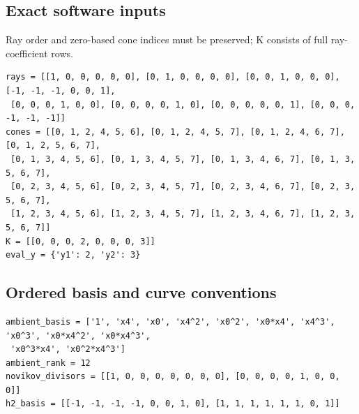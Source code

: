 \documentclass[10pt,a4paper]{article}
\begin{document}
\subsection*{Exact software inputs}
Ray order and zero-based cone indices must be preserved; K consists of full ray-coefficient rows.
\begin{lstlisting}
rays = [[1, 0, 0, 0, 0, 0], [0, 1, 0, 0, 0, 0], [0, 0, 1, 0, 0, 0], [-1, -1, -1, 0, 0, 1],
 [0, 0, 0, 1, 0, 0], [0, 0, 0, 0, 1, 0], [0, 0, 0, 0, 0, 1], [0, 0, 0, -1, -1, -1]]
cones = [[0, 1, 2, 4, 5, 6], [0, 1, 2, 4, 5, 7], [0, 1, 2, 4, 6, 7], [0, 1, 2, 5, 6, 7],
 [0, 1, 3, 4, 5, 6], [0, 1, 3, 4, 5, 7], [0, 1, 3, 4, 6, 7], [0, 1, 3, 5, 6, 7],
 [0, 2, 3, 4, 5, 6], [0, 2, 3, 4, 5, 7], [0, 2, 3, 4, 6, 7], [0, 2, 3, 5, 6, 7],
 [1, 2, 3, 4, 5, 6], [1, 2, 3, 4, 5, 7], [1, 2, 3, 4, 6, 7], [1, 2, 3, 5, 6, 7]]
K = [[0, 0, 0, 2, 0, 0, 0, 3]]
eval_y = {'y1': 2, 'y2': 3}
\end{lstlisting}
\subsection*{Ordered basis and curve conventions}
\begin{lstlisting}
ambient_basis = ['1', 'x4', 'x0', 'x4^2', 'x0^2', 'x0*x4', 'x4^3', 'x0^3', 'x0*x4^2', 'x0*x4^3',
 'x0^3*x4', 'x0^2*x4^3']
ambient_rank = 12
novikov_divisors = [[1, 0, 0, 0, 0, 0, 0, 0], [0, 0, 0, 0, 1, 0, 0, 0]]
h2_basis = [[-1, -1, -1, -1, 0, 0, 1, 0], [1, 1, 1, 1, 1, 1, 0, 1]]
\end{lstlisting}
\end{document}
